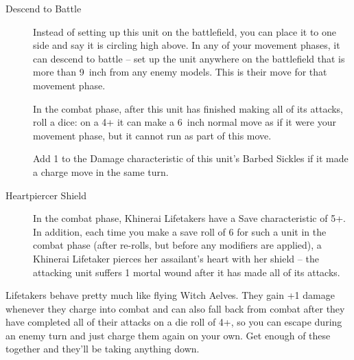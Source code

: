 \begin{description}
    \item [Descend to Battle] Instead of setting
        up this unit on the battlefield, you can place it to one side and say
        it is circling high above. In any of your movement phases, it can
        descend to battle – set up the unit anywhere on the battlefield that is
        more than 9~inch from any enemy models. This is their move for that
        movement phase.
    \item [] In the combat phase,
        after this unit has finished making all of its attacks, roll a dice: on
        a 4+ it can make a 6~inch normal move as if it were your movement
        phase, but it cannot run as part of this move.
    \item [] 
        Add 1 to the Damage characteristic of this unit’s
        Barbed Sickles if it made a charge move in the same turn.
    \item [Heartpiercer Shield] In the combat
        phase, Khinerai Lifetakers have a Save characteristic of 5+. In
        addition, each time you make a save roll of 6 for such a unit in the
        combat phase (after re-rolls, but before any modifiers are applied),
        a Khinerai Lifetaker pierces her assailant’s heart with her shield
        -- the attacking unit suffers 1 mortal wound after it has made all of
        its attacks.
\end{description}

Lifetakers behave pretty much like flying Witch Aelves. They gain +1 damage
whenever they charge into combat and can also fall back from combat after they
have completed all of their attacks on a die roll of 4+, so you can escape
during an enemy turn and just charge them again on your own. Get enough of
these together and they'll be taking anything down.

\newpage %

